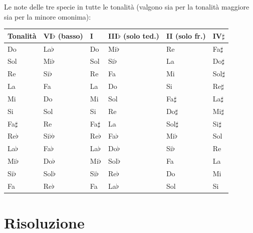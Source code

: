 \begin{esempio}
	\label{ex:seste_costruzione_la}
\end{esempio}

\begin{esempio}
	\label{ex:seste_costruzione_do}
\end{esempio}

Le note delle tre specie in tutte le tonalità (valgono sia per la tonalità maggiore sia per la minore omonima):

\begin{center}
\small
\begin{tabular}{|l|l|l|l|l|l|}
\hline
Tonalità & VI$\flat$ (basso) & I & III$\flat$ (solo ted.) & II (solo fr.) & IV$\sharp$ \\
\hline
Do & La$\flat$ & Do & Mi$\flat$ & Re & Fa$\sharp$ \\
Sol & Mi$\flat$ & Sol & Si$\flat$ & La & Do$\sharp$ \\
Re & Si$\flat$ & Re & Fa & Mi & Sol$\sharp$ \\
La & Fa & La & Do & Si & Re$\sharp$ \\
Mi & Do & Mi & Sol & Fa$\sharp$ & La$\sharp$ \\
Si & Sol & Si & Re & Do$\sharp$ & Mi$\sharp$ \\
Fa$\sharp$ & Re & Fa$\sharp$ & La & Sol$\sharp$ & Si$\sharp$ \\
Re$\flat$ & Si$\flat\flat$ & Re$\flat$ & Fa$\flat$ & Mi$\flat$ & Sol \\
La$\flat$ & Fa$\flat$ & La$\flat$ & Do$\flat$ & Si$\flat$ & Re \\
Mi$\flat$ & Do$\flat$ & Mi$\flat$ & Sol$\flat$ & Fa & La \\
Si$\flat$ & Sol$\flat$ & Si$\flat$ & Re$\flat$ & Do & Mi \\
Fa & Re$\flat$ & Fa & La$\flat$ & Sol & Si \\
\hline
\end{tabular}
\end{center}

\section{Risoluzione}
\label{sec:risoluzione_seste}


